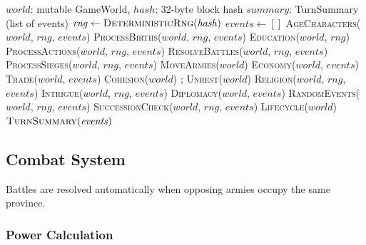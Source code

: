 \documentclass[a4paper, 11pt]{article}
\begin{document}
\begin{algorithm}[htbp]
\caption{Tick Pipeline (simplified)}
\label{alg:tick}
\begin{algorithmic}[1]
\Require $\mathit{world}$: mutable GameWorld, $\mathit{hash}$: 32-byte block hash
\Ensure $\mathit{summary}$: TurnSummary (list of events)
\State $\mathit{rng} \gets \textsc{DeterministicRng}(\mathit{hash})$
\State $\mathit{events} \gets []$
\State \textsc{AgeCharacters}($\mathit{world}$, $\mathit{rng}$, $\mathit{events}$) 
\State \textsc{ProcessBirths}($\mathit{world}$, $\mathit{rng}$, $\mathit{events}$) 
\State \textsc{Education}($\mathit{world}$, $\mathit{rng}$)
\State \textsc{ProcessActions}($\mathit{world}$, $\mathit{rng}$, $\mathit{events}$) 
\State \textsc{ResolveBattles}($\mathit{world}$, $\mathit{rng}$, $\mathit{events}$) 
\State \textsc{ProcessSieges}($\mathit{world}$, $\mathit{rng}$, $\mathit{events}$)
\State \textsc{MoveArmies}($\mathit{world}$)
\State \textsc{Economy}($\mathit{world}$, $\mathit{events}$)
\State \textsc{Trade}($\mathit{world}$, $\mathit{events}$)
\State \textsc{Cohesion}($\mathit{world}$) ; \textsc{Unrest}($\mathit{world}$)
\State \textsc{Religion}($\mathit{world}$, $\mathit{rng}$, $\mathit{events}$)
\State \textsc{Intrigue}($\mathit{world}$, $\mathit{rng}$, $\mathit{events}$) 
\State \textsc{Diplomacy}($\mathit{world}$, $\mathit{events}$)
\State \textsc{RandomEvents}($\mathit{world}$, $\mathit{rng}$, $\mathit{events}$) 
\State \textsc{SuccessionCheck}($\mathit{world}$, $\mathit{rng}$, $\mathit{events}$) 
\State \textsc{Lifecycle}($\mathit{world}$) 
\State \Return $\textsc{TurnSummary}(\mathit{events})$
\end{algorithmic}
\end{algorithm}

\subsection{Combat System}
\label{sec:combat}

Battles are resolved automatically when opposing armies occupy the same province.

\subsubsection{Power Calculation}
\end{document}
